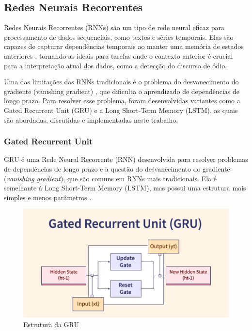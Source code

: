 \documentclass[conference]{IEEEtran}
\begin{document}
\subsection{Redes Neurais Recorrentes}
Redes Neurais Recorrentes (RNNs) são um tipo de rede neural eficaz para processamento de dados sequenciais, como textos e séries temporais. Elas são capazes de capturar dependências temporais ao manter uma memória de estados anteriores \cite{rnns}, tornando-as ideais para tarefas onde o contexto anterior é crucial para a interpretação atual dos dados, como a detecção do discurso de ódio.

Uma das limitações das RNNs tradicionais é o problema do desvanecimento do gradiente (vanishing gradient) \cite{vani}, que dificulta o aprendizado de dependências de longo prazo. Para resolver esse problema, foram desenvolvidas variantes como a Gated Recurrent Unit (GRU) e a Long Short-Term Memory (LSTM), as quais são abordadas, discutidas e implementadas neste trabalho. \\

\subsubsection{Gated Recurrent Unit}

\indent GRU é uma Rede Neural Recorrente (RNN) desenvolvida para resolver problemas de dependências de longo prazo e a questão do desvanecimento do gradiente (\textit{vanishing gradient}), que são comuns em RNNs mais tradicionais. Ela é semelhante à Long Short-Term Memory (LSTM), mas possui uma estrutura mais simples e menos parâmetros \cite{grus}.

\begin{figure}[h!]
    \centering
    \includegraphics[width=\linewidth]{gru.png}
    \caption{Estrutura da GRU}
    \label{fig:gru}
\end{figure}
\end{document}
